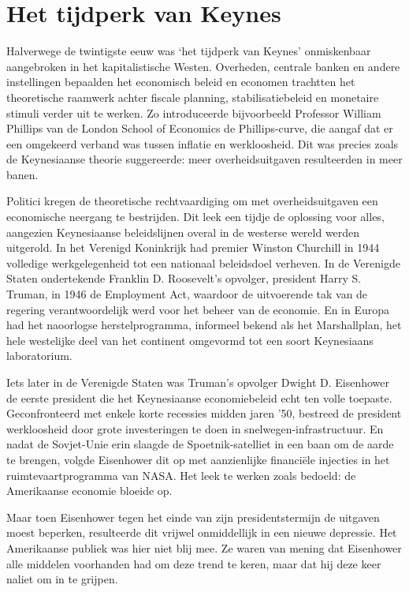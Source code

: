 \documentclass[smalldemyvopaper,11pt,twoside,onecolumn,openright,extrafontsizes,hidelinks]{memoir}
\begin{document}
\section{Het tijdperk van Keynes}\label{het-tijdperk-van-keynes}

Halverwege de twintigste eeuw was `het tijdperk van Keynes' onmiskenbaar
aangebroken in het kapitalistische Westen. Overheden, centrale banken en
andere instellingen bepaalden het economisch beleid en economen
trachtten het theoretische raamwerk achter fiscale planning,
stabilisatiebeleid en monetaire stimuli verder uit te werken. Zo
introduceerde bijvoorbeeld Professor William Phillips van de London
School of Economics de Phillips-curve, die aangaf dat er een omgekeerd
verband was tussen inflatie en werkloosheid. Dit was precies zoals de
Keynesiaanse theorie suggereerde: meer overheidsuitgaven resulteerden in
meer banen.

Politici kregen de theoretische rechtvaardiging om met overheidsuitgaven
een economische neergang te bestrijden. Dit leek een tijdje de oplossing
voor alles, aangezien Keynesiaanse beleidslijnen overal in de westerse
wereld werden uitgerold. In het Verenigd Koninkrijk had premier Winston
Churchill in 1944 volledige werkgelegenheid tot een nationaal
beleidsdoel verheven. In de Verenigde Staten ondertekende Franklin D.
Roosevelt's opvolger, president Harry S. Truman, in 1946 de Employment
Act, waardoor de uitvoerende tak van de regering verantwoordelijk werd
voor het beheer van de economie. En in Europa had het naoorlogse
herstelprogramma, informeel bekend als het Marshallplan, het hele
westelijke deel van het continent omgevormd tot een soort Keynesiaans
laboratorium.

Iets later in de Verenigde Staten was Truman's opvolger Dwight D.
Eisenhower de eerste president die het Keynesiaanse economiebeleid echt
ten volle toepaste. Geconfronteerd met enkele korte recessies midden
jaren '50, bestreed de president werkloosheid door grote investeringen
te doen in snelwegen-infrastructuur. En nadat de Sovjet-Unie erin
slaagde de Spoetnik-satelliet in een baan om de aarde te brengen, volgde
Eisenhower dit op met aanzienlijke financiële injecties in het
ruimtevaartprogramma van NASA. Het leek te werken zoals bedoeld: de
Amerikaanse economie bloeide op.

Maar toen Eisenhower tegen het einde van zijn presidentstermijn de
uitgaven moest beperken, resulteerde dit vrijwel onmiddellijk in een
nieuwe depressie. Het Amerikaanse publiek was hier niet blij mee. Ze
waren van mening dat Eisenhower alle middelen voorhanden had om deze
trend te keren, maar dat hij deze keer naliet om in te grijpen.
\end{document}
